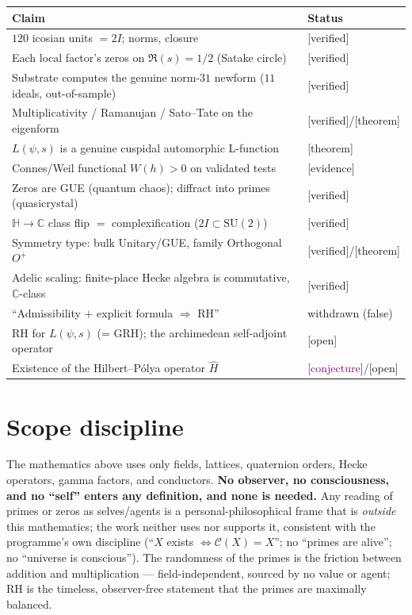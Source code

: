 \documentclass[11pt,a4paper]{article}
\theoremstyle{definition}
\newcommand{\C}{\mathbb{C}}
\newcommand{\TAGthm}{{\small\textsf{[\textcolor{green!45!black}{theorem}]}}}
\newcommand{\TAGver}{{\small\textsf{[\textcolor{blue!60!black}{verified}]}}}
\newcommand{\TAGev}{{\small\textsf{[\textcolor{orange!80!black}{evidence}]}}}
\newcommand{\TAGconj}{{\small\textsf{[\textcolor{purple}{conjecture}]}}}
\newcommand{\TAGopen}{{\small\textsf{[\textcolor{red!70!black}{open}]}}}
\begin{document}
\begin{center}
\begin{tabular}{p{}l}
\toprule
Claim & Status\\
\midrule
$120$ icosian units $=2I$; norms, closure & \TAGver\\
Each local factor's zeros on $\Re(s)=1/2$ (Satake circle) & \TAGver\\
Substrate computes the genuine norm-$31$ newform ($11$ ideals, out-of-sample) & \TAGver\\
Multiplicativity / Ramanujan / Sato--Tate on the eigenform & \TAGver/\TAGthm\\
$L(\psi,s)$ is a genuine cuspidal automorphic L-function & \TAGthm\\
Connes/Weil functional $W(h)>0$ on validated tests & \TAGev\\
Zeros are GUE (quantum chaos); diffract into primes (quasicrystal) & \TAGver\\
$\mathbb{H}\to\C$ class flip $=$ complexification ($2I\subset\mathrm{SU}(2)$) & \TAGver\\
Symmetry type: bulk Unitary/GUE, family Orthogonal $O^+$ & \TAGver/\TAGthm\\
Adelic scaling: finite-place Hecke algebra is commutative, $\C$-class & \TAGver\\
``Admissibility $+$ explicit formula $\Rightarrow$ RH'' & withdrawn (false)\\
RH for $L(\psi,s)$ (= GRH); the archimedean self-adjoint operator & \TAGopen\\
Existence of the Hilbert--Pólya operator $\hat H$ & \TAGconj/\TAGopen\\
\bottomrule
\end{tabular}
\end{center}

\section{Scope discipline}

The mathematics above uses only fields, lattices, quaternion orders, Hecke
operators, gamma factors, and conductors. \textbf{No observer, no
consciousness, and no ``self'' enters any definition, and none is needed.}
Any reading of primes or zeros as selves/agents is a personal-philosophical
frame that is \emph{outside} this mathematics; the work neither uses nor
supports it, consistent with the programme's own discipline (``$X$ exists
$\Leftrightarrow \mathcal{C}(X)=X$''; no ``primes are alive''; no ``universe
is conscious''). The randomness of the primes is the friction between
addition and multiplication --- field-independent, sourced by no value or
agent; RH is the timeless, observer-free statement that the primes are
maximally balanced.
\end{document}
